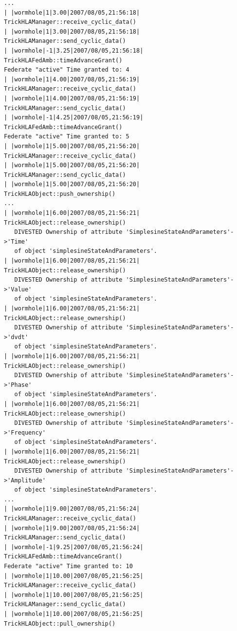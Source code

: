 \begin{lstlisting}[numbers=none,caption={Output stream from the active ownerhsip transfer simulation}]
...
| |wormhole|1|3.00|2007/08/05,21:56:18| TrickHLAManager::receive_cyclic_data()
| |wormhole|1|3.00|2007/08/05,21:56:18| TrickHLAManager::send_cyclic_data()
| |wormhole|-1|3.25|2007/08/05,21:56:18| TrickHLAFedAmb::timeAdvanceGrant()
Federate "active" Time granted to: 4
| |wormhole|1|4.00|2007/08/05,21:56:19| TrickHLAManager::receive_cyclic_data()
| |wormhole|1|4.00|2007/08/05,21:56:19| TrickHLAManager::send_cyclic_data()
| |wormhole|-1|4.25|2007/08/05,21:56:19| TrickHLAFedAmb::timeAdvanceGrant()
Federate "active" Time granted to: 5
| |wormhole|1|5.00|2007/08/05,21:56:20| TrickHLAManager::receive_cyclic_data()
| |wormhole|1|5.00|2007/08/05,21:56:20| TrickHLAManager::send_cyclic_data()
| |wormhole|1|5.00|2007/08/05,21:56:20| TrickHLAObject::push_ownership()
...
| |wormhole|1|6.00|2007/08/05,21:56:21| TrickHLAObject::release_ownership()
   DIVESTED Ownership of attribute 'SimplesineStateAndParameters'->'Time'
   of object 'simplesineStateAndParameters'.
| |wormhole|1|6.00|2007/08/05,21:56:21| TrickHLAObject::release_ownership()
   DIVESTED Ownership of attribute 'SimplesineStateAndParameters'->'Value'
   of object 'simplesineStateAndParameters'.
| |wormhole|1|6.00|2007/08/05,21:56:21| TrickHLAObject::release_ownership()
   DIVESTED Ownership of attribute 'SimplesineStateAndParameters'->'dvdt'
   of object 'simplesineStateAndParameters'.
| |wormhole|1|6.00|2007/08/05,21:56:21| TrickHLAObject::release_ownership()
   DIVESTED Ownership of attribute 'SimplesineStateAndParameters'->'Phase'
   of object 'simplesineStateAndParameters'.
| |wormhole|1|6.00|2007/08/05,21:56:21| TrickHLAObject::release_ownership()
   DIVESTED Ownership of attribute 'SimplesineStateAndParameters'->'Frequency'
   of object 'simplesineStateAndParameters'.
| |wormhole|1|6.00|2007/08/05,21:56:21| TrickHLAObject::release_ownership()
   DIVESTED Ownership of attribute 'SimplesineStateAndParameters'->'Amplitude'
   of object 'simplesineStateAndParameters'.
...
| |wormhole|1|9.00|2007/08/05,21:56:24| TrickHLAManager::receive_cyclic_data()
| |wormhole|1|9.00|2007/08/05,21:56:24| TrickHLAManager::send_cyclic_data()
| |wormhole|-1|9.25|2007/08/05,21:56:24| TrickHLAFedAmb::timeAdvanceGrant()
Federate "active" Time granted to: 10
| |wormhole|1|10.00|2007/08/05,21:56:25| TrickHLAManager::receive_cyclic_data()
| |wormhole|1|10.00|2007/08/05,21:56:25| TrickHLAManager::send_cyclic_data()
| |wormhole|1|10.00|2007/08/05,21:56:25| TrickHLAObject::pull_ownership()

\end{lstlisting}
